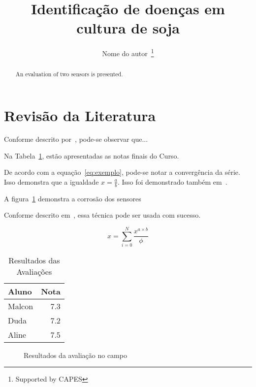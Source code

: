 \documentclass{article}
\title{Identificação de doenças em cultura de soja}
\author{Nome do autor~\footnote{Supported by CAPES}}
\begin{document}
\maketitle
\begin{abstract}
An evaluation of two sensors is presented.
\end{abstract}

\section{Revisão da Literatura}
Conforme descrito por~\cite{wat13}, pode-se observar que...

Na Tabela~\ref{tab:resultado}, estão apresentadas as notas finais do Curso.

De acordo com a equação~\ref{eq:exemplo}, pode-se notar a convergência da série. Isso demonstra que a igualdade $x = \frac{a}{b}$. Isso foi demonstrado também em~\cite{Hennessy2012}.

A figura~\ref{fig:duda} demonstra a corrosão dos sensores~\cite{Szlam2010}

Conforme descrito em~\cite{Huixian2020}, essa técnica pode ser usada com sucesso.

\begin{equation}
x = \sum_{i=0}^{N} \frac{x^{a\times b} }{\phi}
\label{eq:exemplo}
\end{equation}

\begin{table}[htb]
\caption{Resultados das Avaliações}\label{tab:resultado}
\centering
\begin{tabular}{|l|r|}
\hline

\bf Aluno & \bf Nota \\ 
\hline
Malcon & 7.3 \\ \hline
Duda & 7.2 \\ \hline
Aline & 7.5 \\
\hline
\end{tabular}
\end{table}

\begin{figure}[htb]
\centering
\caption{Resultados da avaliação no campo}\label{fig:duda}
\end{figure}



\end{document}
